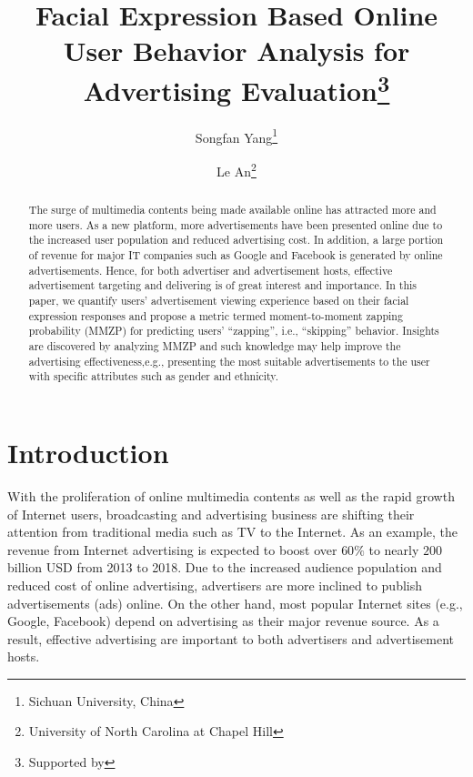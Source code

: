 \documentclass[twoside,leqno,twocolumn]{article}
\begin{document}

\title{\Large Facial Expression Based Online User Behavior Analysis for Advertising Evaluation\thanks{Supported by }}
\author{Songfan Yang\thanks{Sichuan University, China} \\
\and
Le An\thanks{University of North Carolina at Chapel Hill}}
\date{}

\maketitle



\begin{abstract} \small\baselineskip=9pt The surge of multimedia contents being made available online has attracted more and more users. As a new platform, more advertisements have been presented online due to the increased user population and reduced advertising cost. In addition, a large portion of revenue for major IT companies such as Google and Facebook is generated by online advertisements. Hence, for both advertiser and advertisement hosts, effective advertisement targeting and delivering is of great interest and importance. In this paper, we quantify users' advertisement viewing experience based on their facial expression responses and propose a metric termed moment-to-moment zapping probability (MMZP) for predicting users' ``zapping'', i.e., ``skipping'' behavior. Insights are discovered by analyzing MMZP and such knowledge may help improve the advertising effectiveness,e.g., presenting the most suitable advertisements to the user with specific attributes such as gender and ethnicity.\end{abstract}

\section{Introduction}
With the proliferation of online multimedia contents as well as the rapid growth of Internet users, broadcasting and advertising business are shifting their attention from traditional media such as TV to the Internet. As an example, the revenue from Internet advertising is expected to boost over $60\%$ to nearly $200$ billion USD from 2013 to 2018. Due to the increased audience population and reduced cost of online advertising, advertisers are more inclined to publish advertisements (ads) online. On the other hand, most popular Internet sites (e.g., Google, Facebook) depend on advertising as their major revenue source. As a result, effective advertising are important to both advertisers and advertisement hosts.
\end{document}
